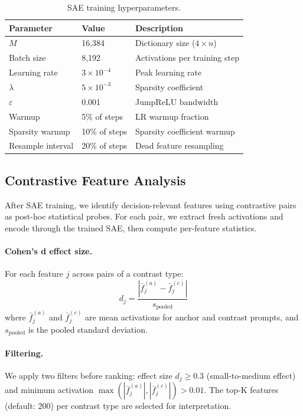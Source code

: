 \documentclass[runningheads]{llncs}
\begin{document}
\begin{table}[t]
\caption{SAE training hyperparameters.}
\label{tab:hyperparams}
\centering
\begin{tabular}{lll}
\toprule
Parameter & Value & Description \\
\midrule
$M$ & 16,384 & Dictionary size ($4\times n$) \\
Batch size & 8,192 & Activations per training step \\
Learning rate & $3 \times 10^{-4}$ & Peak learning rate \\
$\lambda$ & $5 \times 10^{-3}$ & Sparsity coefficient \\
$\varepsilon$ & 0.001 & JumpReLU bandwidth \\
Warmup & 5\% of steps & LR warmup fraction \\
Sparsity warmup & 10\% of steps & Sparsity coefficient warmup \\
Resample interval & 20\% of steps & Dead feature resampling \\
\bottomrule
\end{tabular}
\end{table}

\subsection{Contrastive Feature Analysis}

After SAE training, we identify decision-relevant features using contrastive pairs as post-hoc statistical probes. For each pair, we extract fresh activations and encode through the trained SAE, then compute per-feature statistics.

\paragraph{Cohen's d effect size.} For each feature $j$ across pairs of a contrast type:
\begin{equation}
d_j = \frac{|\bar{f}^{(a)}_j - \bar{f}^{(c)}_j|}{s_\text{pooled}}
\end{equation}
where $\bar{f}^{(a)}_j$ and $\bar{f}^{(c)}_j$ are mean activations for anchor and contrast prompts, and $s_\text{pooled}$ is the pooled standard deviation.

\paragraph{Filtering.} We apply two filters before ranking: effect size $d_j \geq 0.3$ (small-to-medium effect) and minimum activation $\max(|\bar{f}^{(a)}_j|, |\bar{f}^{(c)}_j|) > 0.01$. The top-K features (default: 200) per contrast type are selected for interpretation.
\end{document}
